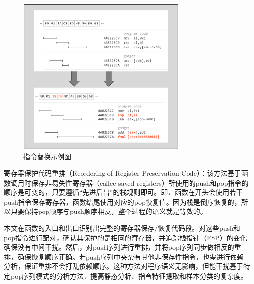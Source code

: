 \begin{figure}[hbt]
	\centering
	\includegraphics[width=0.75\textwidth]{figures/4.2}
	\caption{指令替换示例图}\label{fig:4.2}
\end{figure}

寄存器保护代码重排（Reordering of Register Preservation Code）：该方法基于函数调用时保存非易失性寄存器（callee-saved registers）所使用的push和pop指令的顺序是可变的，只要遵循“先进后出”的栈规则即可。即，函数在开头会使用若干push指令保存寄存器，函数结尾使用对应的pop恢复值。因为栈是倒序恢复的，所以只要保持pop顺序与push顺序相反，整个过程的语义就是等效的。

本文在函数的入口和出口识别出完整的寄存器保存/恢复代码段。对这些push和pop指令进行配对，确认其保护的是相同的寄存器，并追踪栈指针（ESP）的变化确保没有中间干扰。然后，对push序列进行重排，并将pop序列同步做相反的重排，确保恢复顺序正确。若push序列中夹杂有其他非保存性指令，也需进行依赖分析，保证重排不会打乱依赖顺序。这种方法对程序语义无影响，但能干扰基于特定pop序列模式的分析方法，提高静态分析、指令特征提取和样本分类的复杂度。

